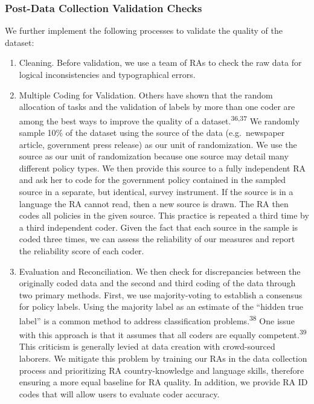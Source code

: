 \documentclass[
]{article}
\begin{document}
\hypertarget{post-data-collection-validation-checks}{%
\subsubsection*{Post-Data Collection Validation Checks}\label{post-data-collection-validation-checks}}

We further implement the following processes to validate the quality of the dataset:

\begin{enumerate}
\def\labelenumi{\arabic{enumi}.}
\item
  Cleaning. Before validation, we use a team of RAs to check the raw data for logical inconsistencies and typographical errors.
\item
  Multiple Coding for Validation. Others have shown that the random allocation of tasks and the validation of labels by more than one coder are among the best ways to improve the quality of a dataset.\textsuperscript{36,37} We randomly sample 10\% of the dataset using the source of the data (e.g.~newspaper article, government press release) as our unit of randomization. We use the source as our unit of randomization because one source may detail many different policy types. We then provide this source to a fully independent RA and ask her to code for the government policy contained in the sampled source in a separate, but identical, survey instrument. If the source is in a language the RA cannot read, then a new source is drawn. The RA then codes all policies in the given source. This practice is repeated a third time by a third independent coder. Given the fact that each source in the sample is coded three times, we can assess the reliability of our measures and report the reliability score of each coder.
\item
  Evaluation and Reconciliation. We then check for discrepancies between the originally coded data and the second and third coding of the data through two primary methods. First, we use majority-voting to establish a consensus for policy labels. Using the majority label as an estimate of the ``hidden true label'' is a common method to address classification problems.\textsuperscript{38} One issue with this approach is that it assumes that all coders are equally competent.\textsuperscript{39} This criticism is generally levied at data creation with crowd-sourced laborers. We mitigate this problem by training our RAs in the data collection process and prioritizing RA country-knowledge and language skills, therefore ensuring a more equal baseline for RA quality. In addition, we provide RA ID codes that will allow users to evaluate coder accuracy.
\end{enumerate}
\end{document}
